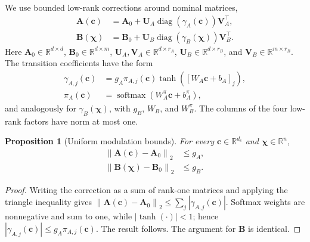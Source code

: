 \documentclass[journal]{IEEEtran}
\newtheorem{proposition}{Proposition}
\newcommand{\vc}{\mathbf{c}}
\newcommand{\vchi}{\boldsymbol{\chi}}
\newcommand{\mA}{\mathbf{A}}
\newcommand{\mB}{\mathbf{B}}
\newcommand{\mU}{\mathbf{U}}
\newcommand{\mV}{\mathbf{V}}
\newcommand{\R}{\mathbb{R}}
\newcommand{\norm}[1]{\left\lVert #1\right\rVert}
\begin{document}
We use bounded low-rank corrections around nominal matrices,
\begin{align}
    \mA(\vc)&=\mA_0+\mU_A\operatorname{diag}(\gamma_A(\vc))\mV_A^\top,
    \label{eq:transition_schedule}\\
    \mB(\vchi)&=\mB_0+\mU_B\operatorname{diag}(\gamma_B(\vchi))\mV_B^\top.
    \label{eq:low_rank_schedules}
\end{align}
Here $\mA_0\in\R^{d\times d}$, $\mB_0\in\R^{d\times m}$, $\mU_A,\mV_A\in\R^{d\times r_A}$, $\mU_B\in\R^{d\times r_B}$, and $\mV_B\in\R^{m\times r_B}$. The transition coefficients have the form
\begin{align}
    \gamma_{A,j}(\vc)&=g_A\pi_{A,j}(\vc)\tanh([W_A\vc+b_A]_j),
    \label{eq:A_modulation_coefficients}\\
    \pi_A(\vc)&=\operatorname{softmax}(W_A^\pi\vc+b_A^\pi),
    \label{eq:A_modulation}
\end{align}
and analogously for $\gamma_B(\vchi)$, with $g_B$, $W_B$, and $W_B^\pi$. The columns of the four low-rank factors have norm at most one.

\begin{proposition}[Uniform modulation bounds]
\label{prop:modulation_bound}
For every $\vc\in\R^{d_c}$ and $\vchi\in\R^n$,
\begin{equation}
    \begin{aligned}
    \norm{\mA(\vc)-\mA_0}_2&\le g_A,\\
    \norm{\mB(\vchi)-\mB_0}_2&\le g_B.
    \end{aligned}
    \label{eq:modulation_bound}
\end{equation}
\end{proposition}
\begin{proof}
Writing the correction as a sum of rank-one matrices and applying the triangle inequality gives
$\norm{\mA(\vc)-\mA_0}_2\le\sum_j|\gamma_{A,j}(\vc)|$. Softmax weights are nonnegative and sum to one, while $|\tanh(\cdot)|<1$; hence $|\gamma_{A,j}(\vc)|\le g_A\pi_{A,j}(\vc)$. The result follows. The argument for $\mB$ is identical.
\end{proof}
\end{document}
